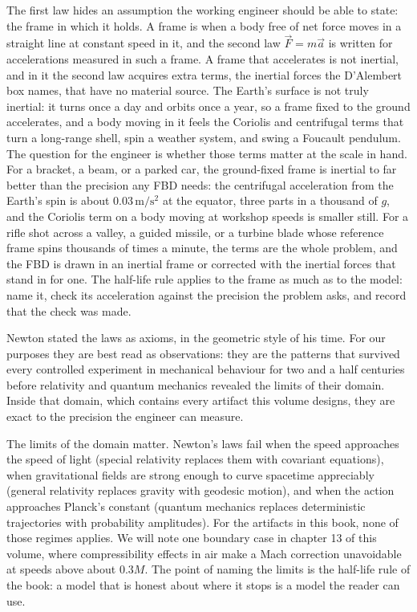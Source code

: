 The first law hides an assumption the working engineer should be able to
state: the frame in which it holds. A frame is  when a body
free of net force moves in a straight line at constant speed in it, and the
second law $\vec{F} = m\vec{a}$ is written for accelerations measured in such a
frame. A frame that accelerates is not inertial, and in it the second law
acquires extra terms, the inertial forces the D'Alembert box names, that have
no material source. The Earth's surface is not truly inertial: it turns once a
day and orbits once a year, so a frame fixed to the ground accelerates, and a
body moving in it feels the Coriolis and centrifugal terms that turn a
long-range shell, spin a weather system, and swing a Foucault pendulum. The
question for the engineer is whether those terms matter at the scale in hand.
For a bracket, a beam, or a parked car, the ground-fixed frame is inertial to
far better than the precision any FBD needs: the centrifugal acceleration from
the Earth's spin is about $0.03\,\si{\meter\per\second\squared}$ at the
equator, three parts in a thousand of $g$, and the Coriolis term on a body
moving at workshop speeds is smaller still. For a rifle shot across a valley, a
guided missile, or a turbine blade whose reference frame spins thousands of
times a minute, the terms are the whole problem, and the FBD is drawn in an
inertial frame or corrected with the inertial forces that stand in for one. The
half-life rule applies to the frame as much as to the model: name it, check its
acceleration against the precision the problem asks, and record that the check
was made.

Newton stated the laws as axioms, in the geometric style of his time.
For our purposes they are best read as observations: they are the
patterns that survived every controlled experiment in mechanical
behaviour for two and a half centuries before relativity and quantum
mechanics revealed the limits of their domain. Inside that domain,
which contains every artifact this volume designs, they are exact to
the precision the engineer can measure.

The limits of the domain matter. Newton's laws fail when the speed
approaches the speed of light (special relativity replaces them with
covariant equations), when gravitational fields are strong enough to
curve spacetime appreciably (general relativity replaces gravity with
geodesic motion), and when the action approaches Planck's constant
(quantum mechanics replaces deterministic trajectories with
probability amplitudes). For the artifacts in this book, none of
those regimes applies. We will note one boundary case in chapter 13
of this volume, where compressibility effects in air make a Mach
correction unavoidable at speeds above about $0.3 M$. The point of
naming the limits is the half-life rule of the book: a model that is
honest about where it stops is a model the reader can use.

